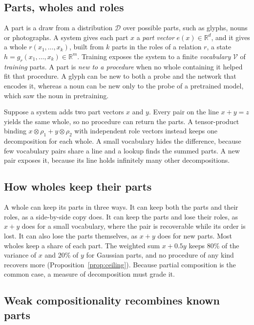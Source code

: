 \documentclass[10pt]{article}
\theoremstyle{plain}
\theoremstyle{remark}
\newcommand{\R}{\mathbb{R}}
\newcommand{\D}{\mathcal{D}}
\newcommand{\Voc}{\mathcal{V}}
\begin{document}
\subsection{Parts, wholes and roles}
\label{sec:intuition}

A part is a draw from a distribution $\D$ over possible parts, such as glyphs, nouns or photographs. A system gives each part $x$ a \emph{part vector} $e(x) \in \R^d$, and it gives a whole $r(x_1, \ldots, x_k)$, built from $k$ parts in the roles of a relation $r$, a state $h = g_r(x_1, \ldots, x_k) \in \R^m$. Training exposes the system to a finite \emph{vocabulary} $\Voc$ of \emph{training} parts. A part is \emph{new to a procedure} when no whole containing it helped fit that procedure. A glyph can be new to both a probe and the network that encodes it, whereas a noun can be new only to the probe of a pretrained model, which saw the noun in pretraining.

Suppose a system adds two part vectors $x$ and $y$. Every pair on the line $x + y = z$ yields the same whole, so no procedure can return the parts. A tensor-product binding $x \otimes \rho_1 + y \otimes \rho_2$ with independent role vectors \citep{smolensky1990} instead keeps one decomposition for each whole. A small vocabulary hides the difference, because few vocabulary pairs share a line and a lookup finds the summed parts. A new pair exposes it, because its line holds infinitely many other decompositions.

\subsection{How wholes keep their parts}
\label{sec:keeps}

A whole can keep its parts in three ways. It can keep both the parts and their roles, as a side-by-side copy does. It can keep the parts and lose their roles, as $x + y$ does for a small vocabulary, where the pair is recoverable while its order is lost. It can also lose the parts themselves, as $x + y$ does for new parts. Most wholes keep a share of each part. The weighted sum $x + 0.5y$ keeps 80\% of the variance of $x$ and 20\% of $y$ for Gaussian parts, and no procedure of any kind recovers more (Proposition~\ref{prop:ceiling}). Because partial composition is the common case, a measure of decomposition must grade it.

\subsection{Weak compositionality recombines known parts}
\label{sec:notions}
\end{document}
